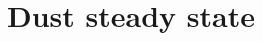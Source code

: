 \documentclass[apj]{emulateapj}
\begin{document}











\section{Dust steady state} 
\label{sect:model-equations}
\end{document}
